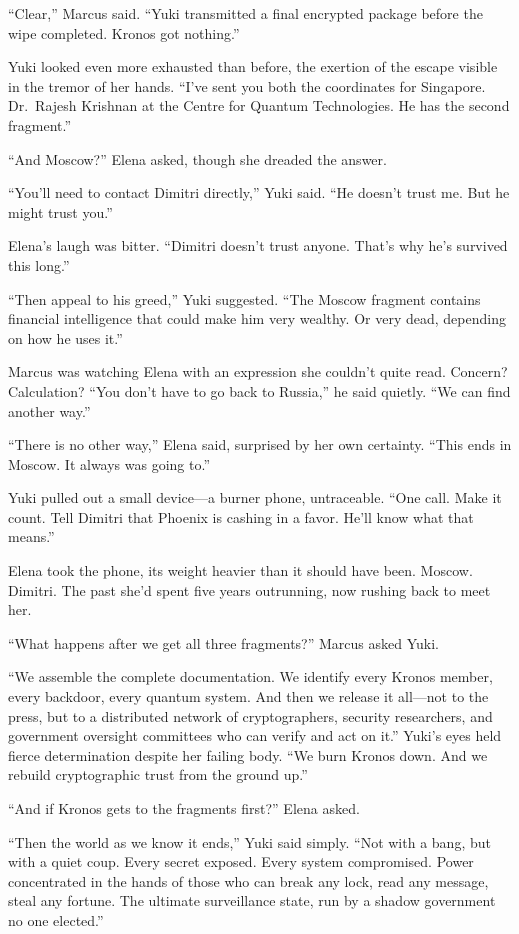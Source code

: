 ``Clear,'' Marcus said. ``Yuki transmitted a final encrypted package before the wipe completed. Kronos got nothing.''

Yuki looked even more exhausted than before, the exertion of the escape visible in the tremor of her hands. ``I've sent you both the coordinates for Singapore. Dr.~Rajesh Krishnan at the Centre for Quantum Technologies. He has the second fragment.''

``And Moscow?'' Elena asked, though she dreaded the answer.

``You'll need to contact Dimitri directly,'' Yuki said. ``He doesn't trust me. But he might trust you.''

Elena's laugh was bitter. ``Dimitri doesn't trust anyone. That's why he's survived this long.''

``Then appeal to his greed,'' Yuki suggested. ``The Moscow fragment contains financial intelligence that could make him very wealthy. Or very dead, depending on how he uses it.''

Marcus was watching Elena with an expression she couldn't quite read. Concern? Calculation? ``You don't have to go back to Russia,'' he said quietly. ``We can find another way.''

``There is no other way,'' Elena said, surprised by her own certainty. ``This ends in Moscow. It always was going to.''

Yuki pulled out a small device---a burner phone, untraceable. ``One call. Make it count. Tell Dimitri that Phoenix is cashing in a favor. He'll know what that means.''

Elena took the phone, its weight heavier than it should have been. Moscow. Dimitri. The past she'd spent five years outrunning, now rushing back to meet her.

``What happens after we get all three fragments?'' Marcus asked Yuki.

``We assemble the complete documentation. We identify every Kronos member, every backdoor, every quantum system. And then we release it all---not to the press, but to a distributed network of cryptographers, security researchers, and government oversight committees who can verify and act on it.'' Yuki's eyes held fierce determination despite her failing body. ``We burn Kronos down. And we rebuild cryptographic trust from the ground up.''

``And if Kronos gets to the fragments first?'' Elena asked.

``Then the world as we know it ends,'' Yuki said simply. ``Not with a bang, but with a quiet coup. Every secret exposed. Every system compromised. Power concentrated in the hands of those who can break any lock, read any message, steal any fortune. The ultimate surveillance state, run by a shadow government no one elected.''

